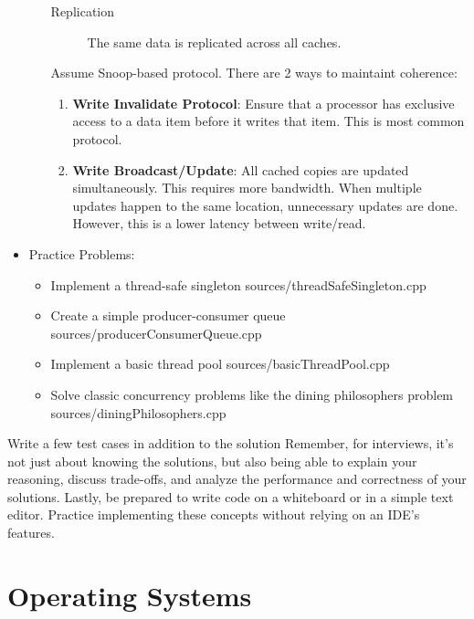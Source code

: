 \documentclass{article}
\begin{document}
\begin{itemize}
\begin{itemize}
              \begin{description}
                \item[Replication]
                  The same data is replicated across all caches.
              \end{description}
              Assume Snoop-based protocol. There are 2 ways to maintaint coherence:
              \begin{enumerate}
                \item \textbf{Write Invalidate Protocol}: Ensure that a processor has exclusive access to a data item before it writes that item. This is most common protocol.
                \item \textbf{Write Broadcast/Update}: All cached copies are updated simultaneously. This requires more bandwidth. When multiple updates happen to the same location, unnecessary updates are done. However, this is a lower latency between write/read.
              \end{enumerate}
          \end{itemize}
        \item Practice Problems:
          \begin{itemize}
            \item Implement a thread-safe singleton
               {sources/threadSafeSingleton.cpp}
            \item Create a simple producer-consumer queue
               {sources/producerConsumerQueue.cpp}
            \item Implement a basic thread pool
               {sources/basicThreadPool.cpp}
            \item Solve classic concurrency problems like the dining philosophers problem
               {sources/diningPhilosophers.cpp}
          \end{itemize}
      \end{itemize}
      Write a few test cases in addition to the solution
      Remember, for interviews, it's not just about knowing the solutions, but also being able to explain your reasoning, discuss trade-offs, and analyze the performance and correctness of your solutions.
      Lastly, be prepared to write code on a whiteboard or in a simple text editor. Practice implementing these concepts without relying on an IDE's features.

\section{Operating Systems}
\end{document}
